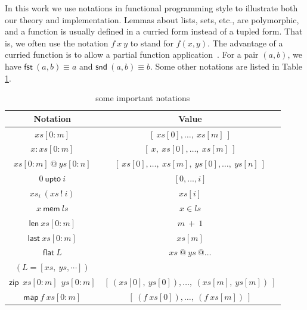 \documentclass[final]{IEEEtran}
\begin{document}
In this work we use notations in functional programming style to
illustrate both our theory and implementation. Lemmas about lists,
sets, etc., are polymorphic, and a function is usually defined in a
curried form instead of a tupled form. That is, we often use the
notation $f~x~y$ to stand for $ f(x,y)$. The advantage of a curried
function is to allow a partial function application~\cite{Pau96}. %
For a pair $(a,b)$, we have $\mathsf{fst\ }(a,b)\equiv a$ and $\mathsf{snd\
}(a,b)\equiv b$. Some other notations are listed in Table \ref{notaions}.
\begin{center}
\begin{table}[tph]
\caption{some important notations}
\label{notaions}
\begin{tabular}{||c|c||}
\hline \hline
Notation & Value\\
\hline \hline
$xs[0:m]$ & $[\ xs[0],\dots,\ xs[m]\ ]$\\
\hline
$x:xs[0:m]$ & $[\ x,\ xs[0],\dots,\ xs[m]\ ]$ \\
\hline
$xs[0:m]\ @\ ys[0:n]$ & $[\ xs[0],\dots,\ xs[m],\ ys[0],\dots,\ ys[n]\ ]$\\
\hline
$0\ \mathsf{upto}\ i$ & $[0,...,i]$\\
\hline
$xs_{i}\ (xs\ !\ i)$ & $xs[i]$\\
\hline
$x\ \mathsf{mem}\ ls$ & $x\in ls$\\
\hline
$ \mathsf{len}~xs[0:m]$ & $m\ +\ 1$\\
\hline
$\mathsf{last}~xs[0:m]$ & $xs[m]$\\
\hline
$\mathsf{flat}\ L$ & $xs\ @\ ys \ @\dots$\\
$(L=[xs,\ ys,\cdots ])$ & \\
\hline
$\mathsf{zip\ }\ xs[0:m]\ \ ys[0:m]$ & $[\ (xs[0],\ ys[0]),\dots,\ (xs[m],\ ys[m])\ ]$\\
\hline
$\mathsf{map\ }f\mathsf{\ }xs[0:m]$ & $[\ (f\ xs[0]),\dots,\ (f\ xs[m])\ ]$\\

\hline \hline
\end{tabular}\\
\end{table}
\end{center}
\end{document}
